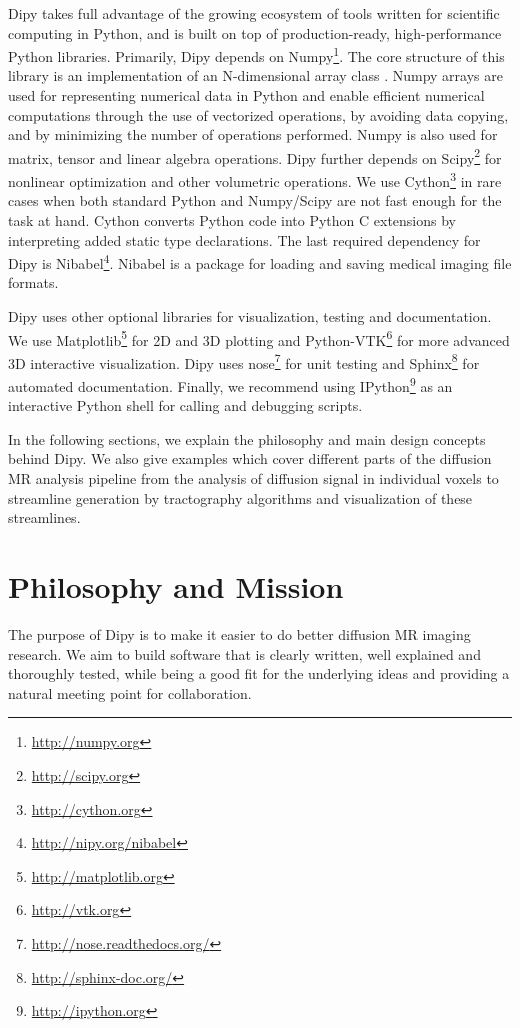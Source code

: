 \documentclass{bioinfo}
\begin{document}
Dipy takes full advantage of the growing ecosystem of tools written for scientific
computing in Python, and is built on top of production-ready, high-performance
Python libraries. Primarily, Dipy depends on
Numpy\footnote{\url{http://numpy.org}}. The core structure of this library is
an implementation of an N-dimensional array class \citep{van_numpy:11}. Numpy arrays are used
for representing numerical data in Python and enable efficient
numerical computations through the use of vectorized operations,
by avoiding data copying, and by minimizing the number of operations
performed. Numpy is also used
for matrix, tensor and linear algebra operations.  Dipy further depends on
Scipy\footnote{\url{http://scipy.org}} for nonlinear optimization and other
volumetric operations.  We use Cython\footnote{\url{http://cython.org}} in rare
cases when both standard Python and Numpy/Scipy are not fast enough for
the task at hand. Cython converts Python code into Python C extensions by
interpreting added static type declarations. The last required dependency for Dipy is
Nibabel\footnote{\url{http://nipy.org/nibabel}}. Nibabel is a package for
loading and saving medical imaging file formats.

Dipy uses other optional libraries for visualization, testing and
documentation. We use Matplotlib\footnote{\url{http://matplotlib.org}} for 2D
and 3D plotting and Python-VTK\footnote{\url{http://vtk.org}} for more advanced
3D interactive visualization. Dipy uses
nose\footnote{\url{http://nose.readthedocs.org/}} for unit testing and
Sphinx\footnote{\url{http://sphinx-doc.org/}} for automated documentation.
Finally, we recommend using IPython\footnote{\url{http://ipython.org}} as an
interactive Python shell for calling and debugging scripts.

In the following sections, we explain the philosophy and main design
concepts behind Dipy. We also give examples which cover different parts of
the diffusion MR analysis pipeline from the analysis of diffusion signal in
individual voxels to streamline generation by tractography algorithms and
visualization of these streamlines.

\section{Philosophy and Mission}

The purpose of Dipy is to make it easier to do better diffusion MR
imaging research. We aim to build software that is clearly written, well
explained and thoroughly tested, while being a good fit for the underlying ideas
and providing a natural meeting point for collaboration.
\end{document}
